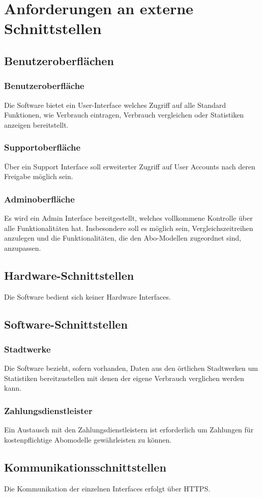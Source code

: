 \section{Anforderungen an externe Schnittstellen}
\subsection{Benutzeroberflächen}
\subsubsection{Benutzeroberfläche}
Die Software bietet ein User-Interface welches Zugriff auf alle Standard Funktionen, wie Verbrauch eintragen, Verbrauch vergleichen oder Statistiken anzeigen bereitstellt.
\subsubsection{Supportoberfläche}
Über ein Support Interface soll erweiterter Zugriff auf User Accounts nach deren Freigabe möglich sein.
\subsubsection{Adminoberfläche}
Es wird ein Admin Interface bereitgestellt, welches vollkommene Kontrolle über alle Funktionalitäten hat.
Insbesondere soll es möglich sein, Vergleichszeitreihen anzulegen und die Funktionalitäten, die den Abo-Modellen zugeordnet sind, anzupassen.
\subsection{Hardware-Schnittstellen}
Die Software bedient sich keiner Hardware Interfaces.
\subsection{Software-Schnittstellen}
\subsubsection{Stadtwerke}
Die Software bezieht, sofern vorhanden, Daten aus den örtlichen Stadtwerken um Statistiken bereitzustellen mit denen der eigene Verbrauch verglichen werden kann.
\subsubsection{Zahlungsdienstleister}
Ein Austausch mit den Zahlungsdienstleistern ist erforderlich um Zahlungen für kostenpflichtige Abomodelle gewährleisten zu können.
\subsection{Kommunikationsschnittstellen}
Die Kommunikation der einzelnen Interfaces erfolgt über HTTPS.